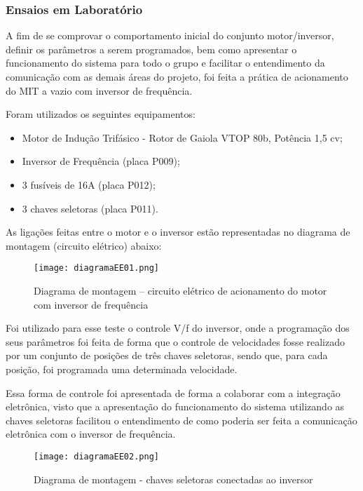 \subsubsection{Ensaios em Laboratório}
		

		A fim de se comprovar o comportamento inicial do conjunto motor/inversor, definir os parâmetros a serem programados, bem como apresentar o funcionamento do sistema para todo o grupo e facilitar o entendimento da comunicação com as demais áreas do projeto, foi feita a prática de acionamento do MIT a vazio com inversor de frequência.

		Foram utilizados os seguintes equipamentos:

		\begin{itemize}
			\item Motor de Indução Trifásico - Rotor de Gaiola VTOP 80b, Potência 1,5 cv;
			\item Inversor de Frequência (placa P009);
			\item 3 fusíveis de 16A (placa P012);
			\item 3 chaves seletoras (placa P011). 
		\end{itemize}

		As ligações feitas entre o motor e o inversor estão representadas no diagrama de montagem (circuito elétrico) abaixo:

		\newpage
		\begin{figure}[!h]
			\centering
			\texttt{[image: diagramaEE01.png]}
			\caption{Diagrama de montagem – circuito elétrico de acionamento do motor com inversor de frequência} 
			\label{diagramaEE01}
		\end{figure}

		Foi utilizado para esse teste o controle V/f do inversor, onde a programação dos seus parâmetros foi feita de forma que o controle de velocidades fosse realizado por um conjunto de posições de três chaves seletoras, sendo que, para cada posição, foi programada uma determinada velocidade. 

		Essa forma de controle foi apresentada de forma a colaborar com a integração eletrônica, visto que a apresentação do funcionamento do sistema utilizando as chaves seletoras facilitou o entendimento de como poderia ser feita a comunicação eletrônica com o inversor de frequência.

		\newpage
		\begin{figure}[!h]
			\centering
			\texttt{[image: diagramaEE02.png]}
			\caption[Diagrama de montagem - chaves seletoras conectadas ao inversor]{Diagrama de montagem - chaves seletoras conectadas ao inversor \cite{WEGIF}} 
			\label{diagramaEE02}
		\end{figure}

